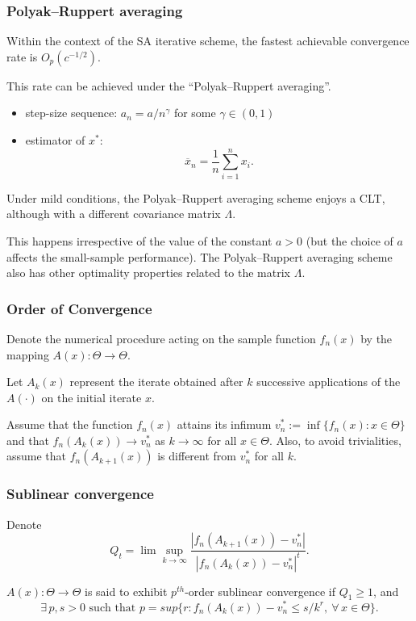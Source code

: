 \documentclass{beamer}
\begin{document}
\begin{frame}
\frametitle{Polyak–Ruppert averaging}

Within the context of the SA iterative scheme, the fastest achievable convergence rate is $O_p(c^{-1/2})$.

\mbox{}

This rate can be achieved under the ``Polyak–Ruppert averaging''.
\begin{itemize}
	\item 
step-size sequence: $a_n = a/{n^{\gamma}}$ for some $\gamma \in (0,1)$
\item
estimator of ${x}^*$:
$$
\overline{x}_n = \frac{1}{n} \sum_{i = 1}^n x_i.
$$
\end{itemize}

Under mild conditions, the Polyak–Ruppert averaging scheme enjoys a CLT, although with a different covariance matrix $\Lambda$.

\mbox{}

This happens irrespective of the value of the constant $a > 0$ (but the choice of $a$ affects the small-sample performance).
The Polyak–Ruppert averaging scheme also has other optimality properties related to
the matrix $\Lambda$.

\end{frame}

\begin{frame}
\frametitle{Order of Convergence}

Denote the numerical procedure acting on the sample function $f_n(x)$ by the mapping
$A(x) : \Theta \rightarrow \Theta$.

\mbox{}

Let $A_k(x)$ represent the iterate obtained after $k$ successive applications
of the $A(\cdot)$ on the initial iterate $x$.

\mbox{}

Assume that the function $f_n(x)$ attains its infimum $v_n^{*} := \inf\{ f_n(x) : x \in \Theta\}$ and
that $f_n (A_k (x)) \rightarrow v_n^{*}$ as $k \rightarrow \infty$ for all $x \in \Theta$.
Also, to avoid trivialities, assume that
$f_n (A_{k+1} (x))$ is different from $v_n^*$ for all $k$.

\end{frame}

\begin{frame}
\frametitle{Sublinear convergence}

Denote
$$
Q_t = \lim \sup_{k \rightarrow \infty} \frac{ | f_n(A_{k+1} (x)) - v_n^* |}
{| f_n (A_k (x)) - v_n^* |^t}.
$$

\mbox{}

\begin{definition}
$A(x) : \Theta \rightarrow \Theta$ is said to exhibit $p^{th}$-order
sublinear convergence if $Q_1 \geq 1$, and
$$
\exists\,p, s > 0 \text{ such that } p = sup \{r : f_n(A_k (x)) - v^*_n \leq s/k^r,\ \forall\, x \in \Theta\}.
$$
\end{definition}

\end{frame}
\end{document}
